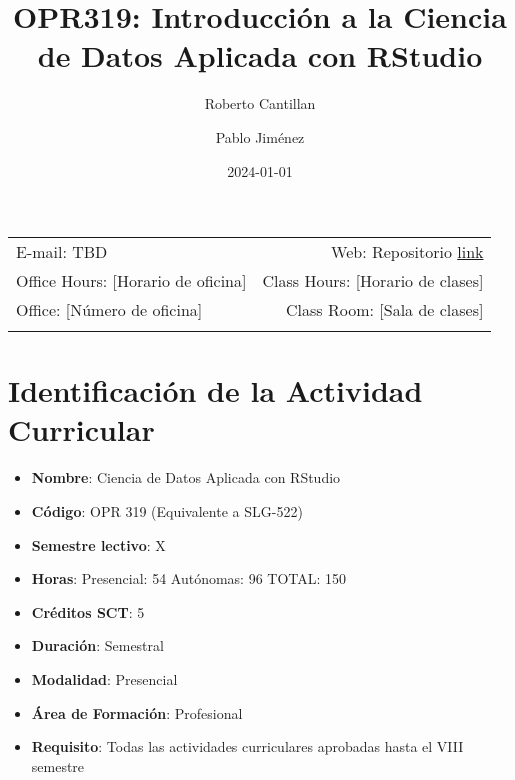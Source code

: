 \documentclass[11pt,letter,]{article}
\title{OPR319: Introducción a la Ciencia de Datos Aplicada con RStudio}
\author{Roberto Cantillan \and Pablo Jiménez}
\date{2024-01-01}
\providecommand{\tightlist}{%
  \setlength{\itemsep}{0pt}\setlength{\parskip}{0pt}}
\begin{document}
  

		\maketitle
		
	
		\thispagestyle{firststyle}



	\noindent \begin{tabular*}{\textwidth}{ @{\extracolsep{\fill}} lr @{\extracolsep{\fill}}}


E-mail: TBD & Web: Repositorio \href{https://github.com/rcantillan/OPR319-Ciencia-de-datos-con-R}{link}\\
Office Hours: {[}Horario de oficina{]}  &  Class Hours: {[}Horario de
clases{]}\\
Office: {[}Número de oficina{]}  & Class Room: {[}Sala de clases{]}\\
	&  \\
	\hline
	\end{tabular*}
	
\vspace{2mm}
	


\hypertarget{identificaciuxf3n-de-la-actividad-curricular}{%
\section{Identificación de la Actividad
Curricular}\label{identificaciuxf3n-de-la-actividad-curricular}}

\begin{itemize}
\tightlist
\item
  \textbf{Nombre}: Ciencia de Datos Aplicada con RStudio
\item
  \textbf{Código}: OPR 319 (Equivalente a SLG-522)
\item
  \textbf{Semestre lectivo}: X
\item
  \textbf{Horas}: Presencial: 54 \textbar{} Autónomas: 96 \textbar{}
  TOTAL: 150
\item
  \textbf{Créditos SCT}: 5
\item
  \textbf{Duración}: Semestral
\item
  \textbf{Modalidad}: Presencial
\item
  \textbf{Área de Formación}: Profesional
\item
  \textbf{Requisito}: Todas las actividades curriculares aprobadas hasta
  el VIII semestre
\end{itemize}
\end{document}
